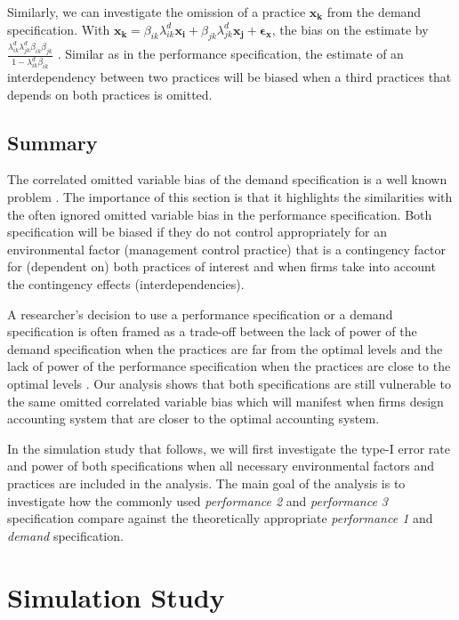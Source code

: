 \documentclass[12pt]{article}
\begin{document}
Similarly, we can investigate the omission of a practice $\mathbf{x_k}$ from the demand specification. With $\mathbf{x_k} = \beta_{ik} \lambda^d_{ik} \mathbf{x_i} + \beta_{jk} \lambda^d_{jk} \mathbf{x_j} + \mathbf{\epsilon_x}$, the bias on the estimate by $\frac{\lambda^d_{ik} \lambda^d_{jk} \beta_{ik} \beta_{jk}}{1 - \lambda^d_{ik} \beta_{ik}}$ . Similar as in the performance specification, the estimate of an interdependency between two practices will be biased when a third practices that depends on both practices is omitted. 

\subsection{Summary}

The correlated omitted variable bias of the demand specification is a well known problem \citep{Grabner2013,Arora1996,Carree2011}. The importance of this section is that it highlights the similarities with the often ignored omitted variable bias in the performance specification. Both specification will be biased if they do not control appropriately for an environmental factor (management control practice) that is a contingency factor for (dependent on) both practices of interest and when firms take into account the contingency effects (interdependencies).

A researcher's decision to use a performance specification or a demand specification is often framed as a trade-off between the lack of power of the demand specification when the practices are far from the optimal levels and the lack of power of the performance specification when the practices are close to the optimal levels \citep{Grabner2013,Aral2012,Johansson2018}. Our analysis shows that both specifications are still vulnerable to the same omitted correlated variable bias which will manifest when firms design accounting system that are closer to the optimal accounting system.

In the simulation study that follows, we will first investigate the type-I error rate and power of both specifications when all necessary environmental factors and practices are included in the analysis. The main goal of the analysis is to investigate how the commonly used \emph{performance 2} and \emph{performance 3} specification compare against the theoretically appropriate \emph{performance 1} and \emph{demand} specification.

\section{Simulation Study}\label{simulation-study}
\end{document}
